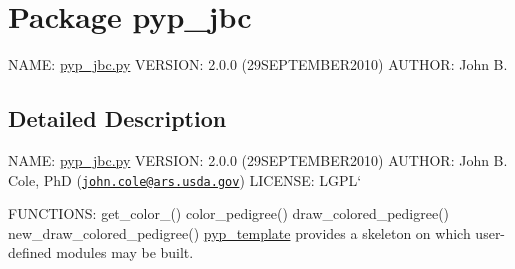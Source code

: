 \hypertarget{namespacepyp__jbc}{
\section{Package pyp\_\-jbc}
\label{namespacepyp__jbc}
}


NAME: \hyperlink{pyp__jbc_8py_source}{pyp\_\-jbc.py} VERSION: 2.0.0 (29SEPTEMBER2010) AUTHOR: John B.  




\subsection{Detailed Description}
NAME: \hyperlink{pyp__jbc_8py_source}{pyp\_\-jbc.py} VERSION: 2.0.0 (29SEPTEMBER2010) AUTHOR: John B. Cole, PhD (\href{mailto:john.cole@ars.usda.gov}{\tt john.cole@ars.usda.gov}) LICENSE: LGPL`

FUNCTIONS: get\_\-color\_() color\_\-pedigree() draw\_\-colored\_\-pedigree() new\_\-draw\_\-colored\_\-pedigree() \hyperlink{namespacepyp__template}{pyp\_\-template} provides a skeleton on which user-\/defined modules may be built. 